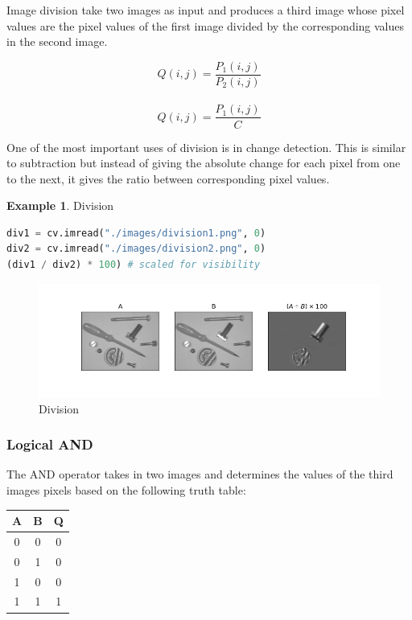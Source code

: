 \documentclass{article}
\theoremstyle{definition}
\newtheorem{ex}{Example}[subsection]
\theoremstyle{remark}
\begin{document}
Image division take two images as input and produces a third image whose pixel values are the pixel values of the first image divided by the corresponding values in the second image.

\begin{equation}
    Q(i, j) = \frac{P_1(i, j)}{P_2(i, j)}
\end{equation}\\

\begin{equation*}
    Q(i, j) = \frac{P_1(i, j)}{C}
\end{equation*}

One of the most important uses of division is in change detection. This is similar to subtraction but instead of giving the absolute change for each pixel from one to the next, it gives the ratio between corresponding pixel values.\\

\begin{ex} Division
\begin{lstlisting}[language=Python]
div1 = cv.imread("./images/division1.png", 0)
div2 = cv.imread("./images/division2.png", 0)
(div1 / div2) * 100) # scaled for visibility
\end{lstlisting}
\begin{figure}[h!]
    \centering
    \includegraphics[width=\textwidth]{ocv_division}
    \caption{Division}
    \label{fig:ocv_division}
\end{figure}
\end{ex}


\subsubsection{Logical AND}

The AND operator takes in two images and determines the values of the third images pixels based on the following truth table:

\begin{table}[H]
    \centering
    \def\arraystretch{1.1}%
    \begin{tabular}{ c c c } 
	\hline
	A & B & Q \\
	\hline
	0 & 0 & 0 \\
	0 & 1 & 0 \\
	1 & 0 & 0 \\
	1 & 1 & 1 \\
	\hline
    \end{tabular}
\end{table}
\end{document}
